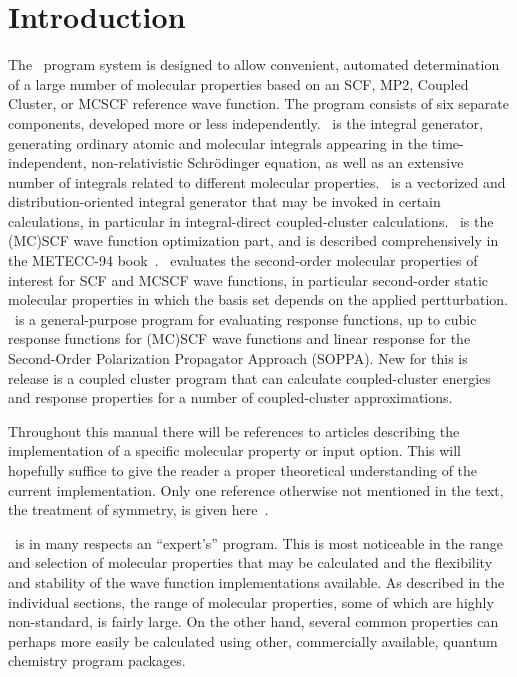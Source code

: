 \chapter{Introduction}\label{ch:intro}

          The \siraba\ program system is designed to allow
convenient, automated determination of a large number of molecular
properties based on an SCF, MP2, Coupled Cluster, or MCSCF reference wave function.
 The program consists
of six separate components, developed more or less independently.
\her\ is the integral generator, generating ordinary
atomic and molecular integrals appearing
in the time-independent, non-relativistic Schr\"{o}dinger
equation, as well as an extensive number of integrals related to
different molecular properties. \eri\ is a vectorized and
distribution-oriented integral generator that may be invoked in
certain calculations, in particular in integral-direct coupled-cluster
calculations. \sir\ is the (MC)SCF wave function 
optimization part, and is described comprehensively in the
METECC-94 book~\cite{hjajhajomotecc}. \aba\ evaluates the
second-order molecular properties of interest for SCF and MCSCF wave
functions, in particular second-order static molecular properties in
which the basis set depends on the applied pertturbation. \resp\ is a general-purpose
program for evaluating response functions, up to cubic response
functions for (MC)SCF wave functions and linear response for the
Second-Order Polarization Propagator Approach (SOPPA). New for this is
release is a coupled cluster program that can calculate
coupled-cluster energies and response properties for a number of
coupled-cluster approximations. 

Throughout this manual there will be references to articles
describing the implementation of a specific molecular property or
input option. This will hopefully suffice to give the reader a proper
theoretical understanding of the current implementation. Only one
reference otherwise not mentioned in the text, the treatment of
symmetry, is given here~\cite{prttca69}.

\siraba\ is in many respects an ``expert's'' program. This is most
noticeable in the range and selection of molecular properties that may
be calculated and the flexibility and stability of the wave function
implementations available. As described in the individual sections, the range of
molecular properties, some of which are highly non-standard, is fairly
large. On the other hand, several common properties can perhaps more
easily be calculated using other, commercially available, quantum
chemistry program packages.

